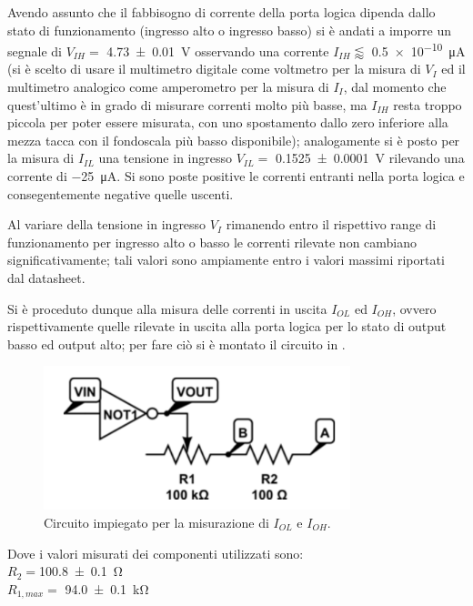 	Avendo assunto che il fabbisogno di corrente della porta logica dipenda 	dallo stato di funzionamento (ingresso alto o ingresso basso)
	si è andati a imporre un segnale di $V_{IH} =$ \SI{4.73\pm 0.01}{\volt} osservando una corrente $I_{IH} \lessapprox$ \SI{0.5e-10}{\micro \ampere} (si è scelto di usare il multimetro digitale come voltmetro per la misura di $V_I$ ed il multimetro analogico come amperometro per la misura di $I_I$, dal momento che quest'ultimo è in grado di misurare correnti molto più basse, ma $I_{IH}$ resta troppo piccola per poter essere misurata, con uno spostamento dallo zero inferiore alla mezza tacca con il fondoscala più basso disponibile);
	analogamente si è posto per la misura di  $I_{IL}$ una tensione in ingresso $V_{IL} =$ \SI{0.1525(1)}{\volt} rilevando una corrente di \SI{-25}{\micro \ampere}. Si sono poste positive le correnti entranti nella porta logica e consegentemente negative quelle uscenti.

	Al variare della tensione in ingresso $V_{I}$ rimanendo entro il rispettivo range di funzionamento per ingresso alto o basso le correnti rilevate non cambiano significativamente; tali valori sono ampiamente entro i valori massimi riportati dal datasheet.

	Si è proceduto dunque alla misura delle correnti in uscita $I_{OL}$ ed $I_{OH}$, ovvero rispettivamente quelle rilevate in uscita alla porta logica per lo stato di output basso ed output alto; per fare ciò si è montato il circuito in .

	\begin{figure}[h]
		\centering
		\includegraphics[scale=0.75]{cir2.png}
		\caption{Circuito impiegato per la misurazione di $I_{OL}$ e $I_{OH}$. }
		\label{f:c2}
	\end{figure}

	Dove i valori misurati dei componenti utilizzati sono:\\
	$R_{2}= $\SI{100.8 \pm 0.1}{\ohm}\\
	$R_{1,max}=$ \SI{94.0 \pm 0.1 }{ \kilo \ohm}\\

